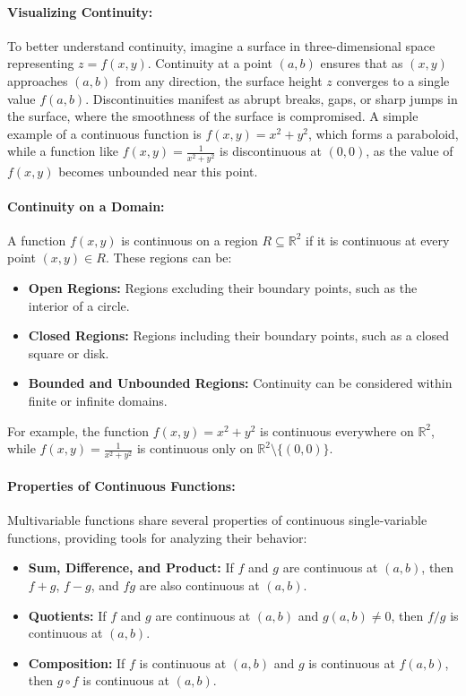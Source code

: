 \paragraph{Visualizing Continuity:}
To better understand continuity, imagine a surface in three-dimensional space representing \( z = f(x, y) \). Continuity at a point \( (a, b) \) ensures that as \( (x, y) \) approaches \( (a, b) \) from any direction, the surface height \( z \) converges to a single value \( f(a, b) \). Discontinuities manifest as abrupt breaks, gaps, or sharp jumps in the surface, where the smoothness of the surface is compromised. A simple example of a continuous function is \( f(x, y) = x^2 + y^2 \), which forms a paraboloid, while a function like \( f(x, y) = \frac{1}{x^2 + y^2} \) is discontinuous at \( (0, 0) \), as the value of \( f(x, y) \) becomes unbounded near this point.

\paragraph{Continuity on a Domain:}
A function \( f(x, y) \) is continuous on a region \( R \subseteq \mathbb{R}^2 \) if it is continuous at every point \( (x, y) \in R \). These regions can be:
\begin{itemize}
    \item \textbf{Open Regions:} Regions excluding their boundary points, such as the interior of a circle.
    \item \textbf{Closed Regions:} Regions including their boundary points, such as a closed square or disk.
    \item \textbf{Bounded and Unbounded Regions:} Continuity can be considered within finite or infinite domains.
\end{itemize}
For example, the function \( f(x, y) = x^2 + y^2 \) is continuous everywhere on \( \mathbb{R}^2 \), while \( f(x, y) = \frac{1}{x^2 + y^2} \) is continuous only on \( \mathbb{R}^2 \setminus \{(0, 0)\} \).

\paragraph{Properties of Continuous Functions:}
Multivariable functions share several properties of continuous single-variable functions, providing tools for analyzing their behavior:
\begin{itemize}
    \item \textbf{Sum, Difference, and Product:} If \( f \) and \( g \) are continuous at \( (a, b) \), then \( f+g \), \( f-g \), and \( fg \) are also continuous at \( (a, b) \).
    \item \textbf{Quotients:} If \( f \) and \( g \) are continuous at \( (a, b) \) and \( g(a, b) \neq 0 \), then \( f/g \) is continuous at \( (a, b) \).
    \item \textbf{Composition:} If \( f \) is continuous at \( (a, b) \) and \( g \) is continuous at \( f(a, b) \), then \( g \circ f \) is continuous at \( (a, b) \).
\end{itemize}

